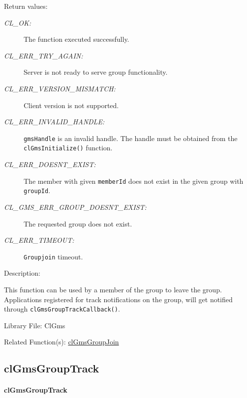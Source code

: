 \begin{flushleft}
       \begin{Desc}
       \item[Return values:]
       \begin{description}
       \item[{\em CL\_\-OK:}]The function executed successfully.
      \item[{\em CL\_\-ERR\_\-TRY\_\-AGAIN:}] Server is not ready to serve group functionality.
          \item[{\em CL\_\-ERR\_\-VERSION\_\-MISMATCH:}] Client version is not supported.
         \item[{\em CL\_\-ERR\_\-INVALID\_\-HANDLE:}] {\tt{gmsHandle}} is an invalid handle. The handle must be obtained from the
{\tt{clGmsInitialize()}} function. 
         \item[{\em CL\_\-ERR\_\-DOESNT\_\-EXIST:}] The member with given {\tt{memberId}} does not exist in the given group with {\tt{groupId}}.
            \item[{\em CL\_\-GMS\_\-ERR\_\-GROUP\_\-DOESNT\_\-EXIST:}] The requested group does not exist.
             \item[{\em CL\_\-ERR\_\-TIMEOUT:}] {\tt{Groupjoin}} timeout.
        \end{description}
         \end{Desc}

        \begin{Desc}
        \item[Description:]

This function can be used by a member of the group to leave the group. Applications registered for track notifications on the group,
will get notified through {\tt{clGmsGroupTrackCallback()}}.  \end{Desc}
       \begin{Desc}
      \item[Library File:]Cl\-Gms\end{Desc}
      \begin{Desc}
  \item[Related Function(s):] \hyperlink{pagegms112}{clGmsGroupJoin}
  \end{Desc}


\newpage
\subsection{clGmsGroupTrack}
\hypertarget{pagegms107}{}\paragraph{cl\-Gms\-Group\-Track}\label{pagegms107}


\end{flushleft}
